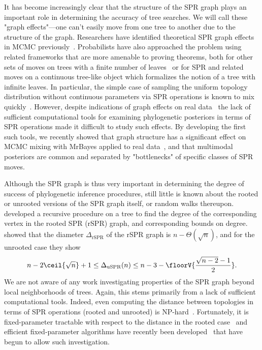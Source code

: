 \documentclass[11pt,onecolumn,conference]{IEEEtran}
\begin{document}
It has become increasingly clear that the structure of the SPR graph plays an important role in determining the accuracy of tree searches.
We will call these "graph effects"---one can't easily move from one tree to another due to the structure of the graph.
Researchers have identified theoretical SPR graph effects in MCMC previously~\cite{Mossel2005-ly,Mossel2006-fo,Ronquist2006-fv,Stefankovic2011-hu}.
Probabilists have also approached the problem using related frameworks that are more amenable to proving theorems, both for other sets of moves on trees with a finite number of leaves~\cite{Aldous2000-vg,Diaconis2002-gy} or for SPR and related moves on a continuous tree-like object which formalizes the notion of a tree with infinite leaves\cite{Evans2006-xh,Athreya2014-de}.
In particular, the simple case of sampling the uniform topology distribution without continuous parameters via SPR operations is known to mix quickly~\cite{spade2014note}.
However, despite indications of graph effects on real data~\cite{beiko2006searching, lakner2008efficiency} the lack of sufficient computational tools for examining phylogenetic posteriors in terms of SPR operations made it difficult to study such effects.
By developing the first such tools, we recently showed that graph structure has a significant effect on MCMC mixing with MrBayes applied to real data~\cite{Whidden2015-yi}, and that multimodal posteriors are common and separated by "bottlenecks" of specific classes of SPR moves.

Although the SPR graph is thus very important in determining the degree of success of phylogenetic inference procedures, still little is known about the rooted or unrooted versions of the SPR graph itself, or random walks thereupon.
\cite{Song2003-gf} developed a recursive procedure on a tree to find the degree of the corresponding vertex in the rooted SPR (rSPR) graph, and corresponding bounds on degree.
\cite{Ding2011-bj} showed that the diameter $\Delta_{\text{rSPR}}$ of the rSPR graph is $n - \Theta(\sqrt n)$, and for the unrooted case they show
$$ n - 2\ceil{\sqrt{n}} + 1
\le \Delta_{\text{uSPR}}(n)
\le n - 3 - \floorV{\frac{\sqrt{n - 2} - 1}{2}}.
$$
We are not aware of any work investigating properties of the SPR graph beyond local neighborhoods of trees.
Again, this stems primarily from a lack of sufficient computational tools.
Indeed, even computing the distance between topologies in terms of SPR operations (rooted and unrooted) is NP-hard~\cite{bordewich05,hickey2008sdc}.
Fortunately, it is fixed-parameter tractable with respect to the distance in the rooted case~\cite{bordewich05} and efficient fixed-parameter algorithms have recently been developed~\cite{whidden2013hybridization,Whidden2015-yi} that have begun to allow such investigation. 
\end{document}
